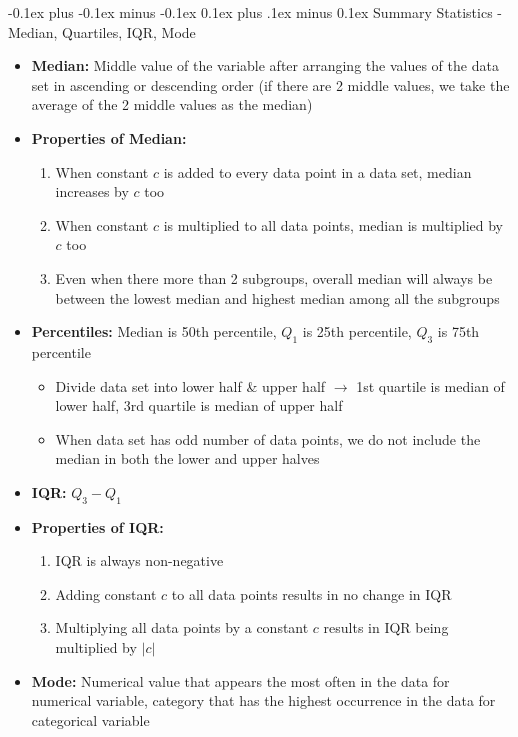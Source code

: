 \documentclass[landscape]{article}
\makeatletter
\renewcommand{\subsection}{\@startsection{subsection}{2}{0mm}%
  {-0.1ex plus -0.1ex minus -0.1ex}%
  {0.1ex plus .1ex minus 0.1ex}%
{\normalfont\scriptsize\bfseries}}
\makeatother
\begin{document}
\begin{multicols*}{5}
    \subsection{Summary Statistics - Median, Quartiles, IQR, Mode}
      \begin{itemize}
        \item \textbf{Median:} Middle value of the variable after arranging the values of the data set in ascending or descending order (if there are 2 middle values, we take the average of the 2 middle values as the median)
        \item \textbf{Properties of Median:}
        \begin{enumerate}
          \item When constant $c$ is added to every data point in a data set, median increases by $c$ too
          \item When constant $c$ is multiplied to all data points, median is multiplied by $c$ too
          \item Even when there more than 2 subgroups, overall median will always be between the lowest median and highest median among all the subgroups
        \end{enumerate}
        \item \textbf{Percentiles:} Median is 50th percentile, $Q_1$ is 25th percentile, $Q_3$ is 75th percentile
        \begin{itemize}
          \item Divide data set into lower half \& upper half $\rightarrow$ 1st quartile is median of lower half, 3rd quartile is median of upper half
          \item When data set has odd number of data points, we do not include the median in both the lower and upper halves
        \end{itemize}
        \item \textbf{IQR:} $Q_3 - Q_1$
        \item \textbf{Properties of IQR:}
        \begin{enumerate}
          \item IQR is always non-negative
          \item Adding constant $c$ to all data points results in no change in IQR
          \item Multiplying all data points by a constant $c$ results in IQR being multiplied by $|c|$
        \end{enumerate}
        \item \textbf{Mode:} Numerical value that appears the most often in the data for numerical variable, category that has the highest occurrence in the data for categorical variable
      \end{itemize}
    

\end{multicols*}
\end{document}
